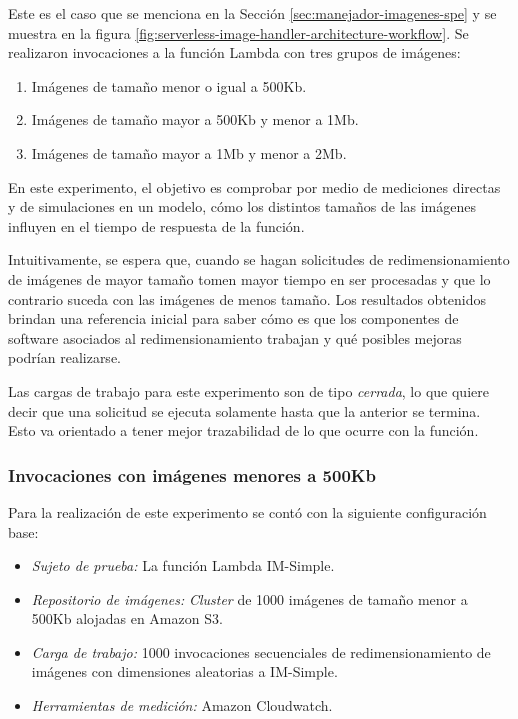 Este es el caso que se menciona en la Sección \ref{sec:manejador-imagenes-spe} y se muestra en la figura \ref{fig:serverless-image-handler-architecture-workflow}. Se realizaron invocaciones a la función Lambda con tres grupos de imágenes:
\begin{enumerate}
    \item Imágenes de tamaño menor o igual a 500Kb.
    \item Imágenes de tamaño mayor a 500Kb y menor a 1Mb.
    \item Imágenes de tamaño mayor a 1Mb y menor a 2Mb.
\end{enumerate}
En este experimento, el objetivo es comprobar por medio de mediciones directas y de simulaciones en un modelo, cómo los distintos tamaños de las imágenes influyen en el tiempo de respuesta de la función.

Intuitivamente, se espera que, cuando se hagan solicitudes de redimensionamiento de imágenes de mayor tamaño tomen mayor tiempo en ser procesadas y que lo contrario suceda con las imágenes de menos tamaño. Los resultados obtenidos brindan una referencia inicial para saber cómo es que los componentes de software asociados al redimensionamiento trabajan y qué posibles mejoras podrían realizarse.

Las cargas de trabajo para este experimento son de tipo \emph{cerrada}, lo que quiere decir que una solicitud se ejecuta solamente hasta que la anterior se termina. Esto va orientado a tener mejor trazabilidad de lo que ocurre con la función.

\subsubsection{Invocaciones con imágenes menores a 500Kb}
Para la realización de este experimento se contó con la siguiente configuración base:
\begin{itemize}
    \item \emph{Sujeto de prueba:} La función Lambda IM-Simple.
    \item \emph{Repositorio de imágenes:} \emph{Cluster} de 1000 imágenes de tamaño menor a 500Kb alojadas en Amazon S3.     
    \item \emph{Carga de trabajo:} 1000 invocaciones secuenciales de redimensionamiento de imágenes con dimensiones aleatorias a IM-Simple.
    \item \emph{Herramientas de medición:} Amazon Cloudwatch.
\end{itemize}

